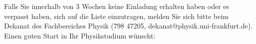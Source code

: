 Falls Sie innerhalb von 3 Wochen keine Einladung erhalten haben oder es verpasst haben, sich auf die Liste einzutragen, melden Sie sich bitte beim Dekanat des Fachbereiches Physik (798 47205, dekanat@physik.uni-frankfurt.de).\\
Einen guten Start in Ihr Physikstudium wünscht:\\
